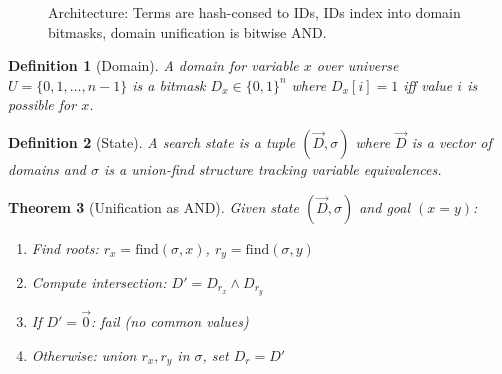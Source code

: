 \documentclass[11pt,a4paper]{article}
\newtheorem{theorem}{Theorem}
\newtheorem{definition}[theorem]{Definition}
\begin{document}
\begin{figure}[ht]
\centering
{}
\caption{Architecture: Terms are hash-consed to IDs, IDs index into domain bitmasks, domain unification is bitwise AND.}
\label{fig:architecture}
\end{figure}

\begin{definition}[Domain]
A \emph{domain} for variable $x$ over universe $U = \{0, 1, \ldots, n-1\}$ is a bitmask $D_x \in \{0,1\}^n$ where $D_x[i] = 1$ iff value $i$ is possible for $x$.
\end{definition}

\begin{definition}[State]
A \emph{search state} is a tuple $(\vec{D}, \sigma)$ where $\vec{D}$ is a vector of domains and $\sigma$ is a union-find structure tracking variable equivalences.
\end{definition}

\begin{theorem}[Unification as AND]
Given state $(\vec{D}, \sigma)$ and goal $(x = y)$:
\begin{enumerate}
  \item Find roots: $r_x = \text{find}(\sigma, x)$, $r_y = \text{find}(\sigma, y)$
  \item Compute intersection: $D' = D_{r_x} \land D_{r_y}$
  \item If $D' = \vec{0}$: fail (no common values)
  \item Otherwise: union $r_x, r_y$ in $\sigma$, set $D_{r} = D'$
\end{enumerate}
\end{theorem}
\end{document}

